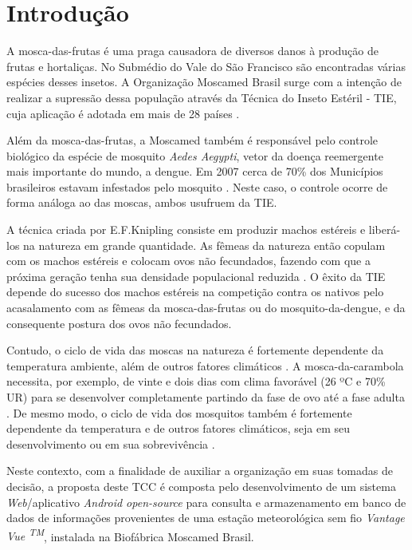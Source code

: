 \chapter{Introdução}

A mosca-das-frutas é uma praga causadora de diversos danos à produção de frutas e hortaliças. No Submédio do Vale do São Francisco são encontradas várias espécies desses insetos. A Organização Moscamed Brasil surge com a intenção de realizar a supressão dessa população através da Técnica do Inseto Estéril - TIE, cuja aplicação é adotada em mais de 28 países \cite{MOSCAMEDINST2003}. 

Além da mosca-das-frutas, a Moscamed também é responsável pelo controle biológico da espécie de mosquito \textit{Aedes Aegypti}, vetor da doença reemergente mais importante do mundo, a dengue. Em 2007 cerca de 70\% dos Municípios brasileiros estavam infestados pelo mosquito \cite{BRAGA2007}. Neste caso, o controle ocorre de forma análoga ao das moscas, ambos usufruem da TIE.

A técnica criada por E.F.Knipling consiste em produzir machos estéreis e liberá-los na natureza em grande quantidade. As fêmeas da natureza então copulam com os machos estéreis e colocam ovos não fecundados, fazendo com que a próxima geração tenha sua densidade populacional reduzida \cite{paranhos2008moscas}. O êxito da TIE depende do sucesso dos machos estéreis na competição contra os nativos pelo acasalamento com as fêmeas da mosca-das-frutas ou do mosquito-da-dengue, e da consequente postura dos ovos não fecundados.

Contudo, o ciclo de vida das moscas na natureza é fortemente dependente da temperatura ambiente, além de outros fatores climáticos \cite{raga2000manejo}. A mosca-da-carambola necessita, por exemplo, de vinte e dois dias com clima favorável (26 ºC e 70\% UR) para se desenvolver completamente partindo da fase de ovo até a fase adulta \cite{malavasi2000moscas}. De mesmo modo, o ciclo de vida dos mosquitos também é fortemente dependente da temperatura e de outros fatores climáticos, seja em seu desenvolvimento ou em sua sobrevivência \cite{hopp2001global, ribeiro2006associaccao}.

Neste contexto, com a finalidade de auxiliar a organização em suas tomadas de decisão, a proposta deste TCC é composta pelo desenvolvimento de um sistema \textit{Web}/aplicativo \textit{Android open-source} para consulta e armazenamento em banco de dados de informações provenientes de uma estação meteorológica sem fio \textit{Vantage Vue \textsuperscript{TM}}, instalada na Biofábrica Moscamed Brasil.

